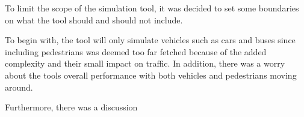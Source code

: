 
To limit the scope of the simulation tool, it was decided to set some boundaries on what the tool should and should not include. 

To begin with, the tool will only simulate vehicles such as cars and buses since including pedestrians was deemed too far fetched because of the added complexity and their small impact on traffic. In addition, there was a worry about the tools overall performance with both vehicles and pedestrians moving around.

Furthermore, there was a discussion

